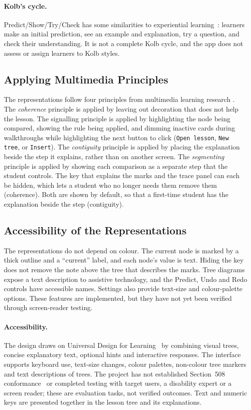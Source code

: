 \paragraph{Kolb's cycle.} Predict/Show/Try/Check has some similarities to experiential learning~\cite{Kolb1984}: learners make an initial prediction, see an example and explanation, try a question, and check their understanding. It is not a complete Kolb cycle, and the app does not assess or assign learners to Kolb styles.

\subsection{Applying Multimedia Principles}
The representations follow four principles from multimedia learning research \cite{Mayer_2020}. The \emph{coherence} principle is applied by leaving out decoration that does not help the lesson. The signalling principle is applied by highlighting the node being compared, showing the rule being applied, and dimming inactive cards during walkthroughs while highlighting the next button to click (\texttt{Open lesson}, \texttt{New tree}, or \texttt{Insert}). The \emph{contiguity} principle is applied by placing the explanation beside the step it explains, rather than on another screen. The \emph{segmenting} principle is applied by showing each comparison as a separate step that the student controls. The key that explains the marks and the trace panel can each be hidden, which lets a student who no longer needs them remove them (coherence). Both are shown by default, so that a first-time student has the explanation beside the step (contiguity).

\subsection{Accessibility of the Representations}
The representations do not depend on colour. The current node is marked by a thick outline and a ``current'' label, and each node's value is text. Hiding the key does not remove the note above the tree that describes the marks. Tree diagrams expose a text description to assistive technology, and the Predict, Undo and Redo controls have accessible names. Settings also provide text-size and colour-palette options. These features are implemented, but they have not yet been verified through screen-reader testing.
 
\paragraph{Accessibility.} The design draws on Universal Design for Learning~\cite{CAST2018} by combining visual trees, concise explanatory text, optional hints and interactive responses. The interface supports keyboard use, text-size changes, colour palettes, non-colour tree markers and text descriptions of trees. The project has not established Section~508 conformance~\cite{Sec508} or completed testing with target users, a disability expert or a screen reader; these are evaluation tasks, not verified outcomes. Text and numeric keys are presented together in the lesson tree and its explanations.